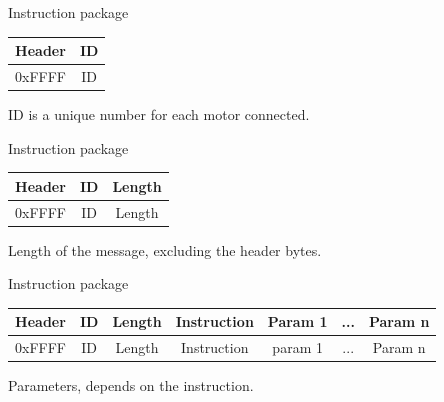 \documentclass{beamer}
\begin{document}


\begin{frame}{Instruction package}
 
    \begin{table}
        \begin{flushleft}
            \begin{tabular}{| c | c |}
                \hline
                Header & ID\\
                \hline
                0xFFFF & ID\\
                \hline
            \end{tabular}
        \end{flushleft}
    \end{table}

    ID is a unique number for each motor connected.
    
\end{frame}




\begin{frame}{Instruction package}
 
    \begin{table}
        \begin{flushleft}
            \begin{tabular}{| c | c | c |}
                \hline
                Header & ID & Length\\
                \hline
                0xFFFF & ID & Length \\
                \hline
            \end{tabular}
        \end{flushleft}
    \end{table}

    Length of the message, excluding the header bytes.
    
\end{frame}





\begin{frame}{Instruction package}
 
    \begin{table}
        \begin{flushleft}
            \begin{tabular}{| c | c | c | c | c | c | c |}
                \hline
                Header & ID & Length & Instruction & Param 1 & ... & Param n\\
                \hline
                0xFFFF & ID & Length & Instruction & param 1 & ... & Param n\\
                \hline
            \end{tabular}
        \end{flushleft}
    \end{table}

    Parameters, depends on the instruction.
    
\end{frame}
\end{document}
